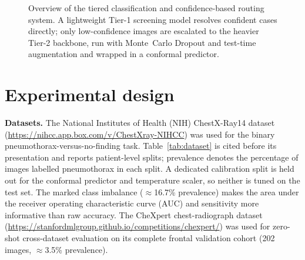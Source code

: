 \documentclass[pdflatex,sn-nature]{sn-jnl}
\begin{document}
\begin{figure}[t]
\centering
{}
\caption{Overview of the tiered classification and confidence-based routing system. A lightweight Tier-1 screening model resolves confident cases directly; only low-confidence images are escalated to the heavier Tier-2 backbone, run with Monte~Carlo Dropout and test-time augmentation and wrapped in a conformal predictor.}\label{fig:architecture}
\end{figure}

\section{Experimental design}\label{sec:experimental}

\textbf{Datasets.} The National Institutes of Health (NIH) ChestX-Ray14 dataset \cite{wang2017chestxray} (\url{https://nihcc.app.box.com/v/ChestXray-NIHCC}) was used for the binary pneumothorax-versus-no-finding task. Table~\ref{tab:dataset} is cited before its presentation and reports patient-level splits; prevalence denotes the percentage of images labelled pneumothorax in each split. A dedicated calibration split is held out for the conformal predictor and temperature scaler, so neither is tuned on the test set. The marked class imbalance ($\approx$16.7\% prevalence) makes the area under the receiver operating characteristic curve (AUC) and sensitivity more informative than raw accuracy. The CheXpert chest-radiograph dataset \cite{irvin2019chexpert} (\url{https://stanfordmlgroup.github.io/competitions/chexpert/}) was used for zero-shot cross-dataset evaluation on its complete frontal validation cohort (202 images, $\approx$3.5\% prevalence).
\end{document}
